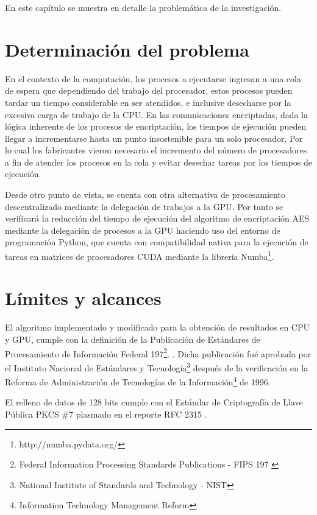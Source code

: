 \documentclass[../main.tex]{subfiles}
\begin{document}
\espacio

  En este capítulo se muestra en detalle la problemática de la investigación.

  \section{Determinación del problema}

  En el contexto de la computación, los procesos a ejecutarse ingresan a una cola de espera que dependiendo del trabajo del procesador, estos procesos pueden tardar un tiempo considerable en ser atendidos, e inclusive desecharse por la excesiva carga de trabajo de la CPU. En las comunicaciones encriptadas, dada la lógica inherente de los procesos de encriptación, los tiempos de ejecución pueden llegar a incrementarse hasta un punto insostenible para un solo procesador. Por lo cual los fabricantes vieron necesario el incremento del número de procesadores a fin de atender los procesos en la cola y evitar desechar tareas por los tiempos de ejecución.

  Desde otro punto de vista, se cuenta con otra alternativa de procesamiento descentralizado mediante la delegación de trabajos a la GPU. Por tanto se verificará la reducción del tiempo de ejecución del algoritmo de encriptación AES mediante la delegación de procesos a la GPU haciendo uso del entorno de programación Python, que cuenta con compatibilidad nativa para la ejecución de tareas en matrices de procesadores CUDA mediante la librería Numba\footnote{http://numba.pydata.org/}.

  \section{Límites y alcances}

  El algoritmo implementado y modificado para la obtención de resultados en CPU y GPU, cumple con la definición de la Publicación de Estándares de Procesamiento de Información Federal 197\footnote{Federal Information Processing Standards Publications - FIPS 197 \cite{report:FIPS_197}}. \cite{report:FIPS_197}. Dicha publicación fué aprobada por el Instituto Nacional de Estándares y Tecnología\footnote{National Institute of Standards and Technology - NIST} después de la verificación en la Reforma de Administración de Tecnologías de la Información\footnote{Information Technology Management Reform} de 1996.

  El relleno de datos de 128 bits cumple con el Estándar de Criptografía de Llave Pública PKCS \#7 plasmado en el reporte RFC 2315 \cite{report:RFC_2315}.
\end{document}
